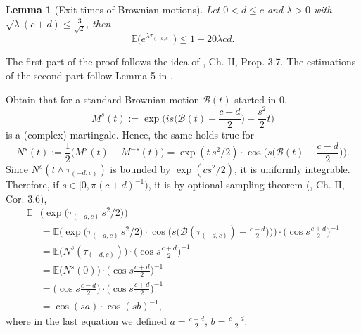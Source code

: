 \documentclass[11pt]{article}
\makeatletter
\renewenvironment{proof}[1][\proofname]{
   \par\pushQED{\qed}\normalfont
   \topsep6\p@\@plus6\p@\relax
   \trivlist\item[\hskip\labelsep\bfseries#1\@addpunct{.}]
   \ignorespaces
}{
   \popQED\endtrivlist\@endpefalse
}
\numberwithin{equation}{section}
\def\Ex{\mathbb{E}}
\newtheorem{lemma}[theorem]{Lemma}
\makeatother
\begin{document}
\begin{lemma}[Exit times of Brownian motions]
  \label{exit times of BM}
  Let $0 < d \leq c$ and $\lambda > 0$ with
  \hbox{$\sqrt{\lambda}(c+d) \leq \frac{3}{\sqrt{2}}$}, 
  then
  $$
  \Ex \big( e^{\lambda \tau_{(-d,c)}} \big)
  \leq 1 + 20 \lambda c d.
  $$
\end{lemma}

\begin{proof}
  The first part of the proof follows the idea 
  of \cite{revuz}, Ch. II, Prop. 3.7. The estimations
  of the second part follow Lemma 5 in \cite{jerison}.

  Obtain that for a standard Brownian motion $\mathcal{B}(t)$
  started in $0$,
  \begin{equation}\nonumber
  M^s(t) :=
    \exp 
      \Big( i s \Big(
      \mathcal{B}(t) - \frac{c-d}{2} \Big) + 
      \frac{s^2}{2}t \Big)
  \end{equation}
  is a (complex) martingale. Hence, the same holds true for 
  \begin{equation}\nonumber
    N^s(t) := 
    \frac{1}{2} \big( M^s(t) + M^{-s}(t) \Big) 
    = \exp ( t \,s^2 /2 ) 
        \cdot \cos \Big(
        s \Big( \mathcal{B}(t) - \frac{c-d}{2}\Big) \Big).
  \end{equation} 
  Since $N^s(t \land \tau_{(-d,c)})$ is bounded by 
  $\exp ( c s^2 /2)$, it is uniformly integrable.  
  Therefore, if $s \in [0, \pi (c+d)^{-1})$, 
  it is by optional sampling theorem (\cite{revuz}, Ch. II, Cor. 3.6), 
  \begin{equation}\nonumber
  \begin{split}
    \Ex &\big( \exp 
      \big( \tau_{(-d,c)} \, s^2 / 2 \big) \big)\\
      & =  \Ex \Big(
      \exp \big(  \tau_{(-d,c)}\, s^2 /2 \big)
        \cdot \cos \Big(
        s \Big( \mathcal{B}(\tau_{(-d,c)}) - 
        \frac{c-d}{2} \Big) \Big) \Big)
        \cdot \Big( \cos  s \frac{c+d}{2} \Big)^{-1} \\
    & = \Ex \big( N^s(\tau_{(-d,c)}) \big) 
          \cdot \Big( \cos
          s \frac{c+d}{2} \Big)^{-1}\\
    & =  \Ex \big( N^s(0) \big) 
          \cdot \Big( \cos s \frac{c+d}{2} \Big)^{-1}\\
    & = \Big(\cos s \frac{c-d}{2} \Big) 
          \cdot \Big(\cos s \frac{c+d}{2} \Big)^{-1}\\
    & = \cos(s a) 
        \cdot \cos (s b)^{-1},
  \end{split}
  \end{equation}
  where in the last equation we defined  
  $a = \frac{c-d}{2}$, $b = \frac{c+d}{2}$.


\end{proof}
\end{document}
